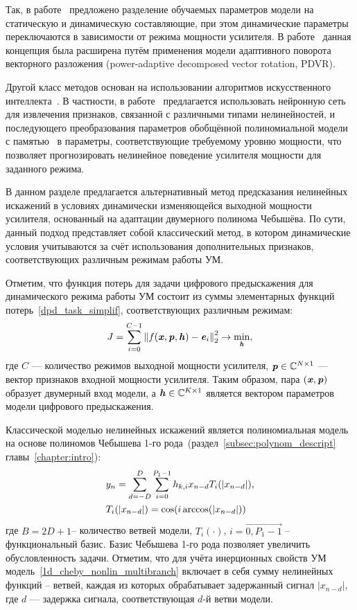 Так, в работе~\cite{GuoYan_PA_DPD_2015} предложено разделение обучаемых параметров модели на статическую и динамическую составляющие, при этом динамические параметры переключаются в зависимости от режима мощности усилителя. В работе~\cite{GuoYan_PA_DPD_Poly} данная концепция была расширена путём применения модели адаптивного поворота векторного разложения (power-adaptive decomposed vector rotation, PDVR).

Другой класс методов основан на использовании алгоритмов искусственного интеллекта~\cite{Dynamic_DPD_ANN, Dynamic_DPD_CNN}. В частности, в работе~\cite{Dynamic_DPD_ANN} предлагается использовать нейронную сеть для извлечения признаков, связанной с различными типами нелинейностей, и последующего преобразования параметров обобщённой полиномиальной модели с памятью~\cite{dpd_models} в параметры, соответствующие требуемому уровню мощности, что позволяет прогнозировать нелинейное поведение усилителя мощности для заданного режима.

В данном разделе предлагается альтернативный метод предсказания нелинейных искажений в условиях динамически изменяющейся выходной мощности усилителя, основанный на адаптации двумерного полинома Чебышёва. По сути, данный подход представляет собой классический метод, в котором динамические условия учитываются за счёт использования дополнительных признаков, соответствующих различным режимам работы УМ.

Отметим, что функция потерь для задачи цифрового предыскажения для динамического режима работы УМ состоит из суммы элементарных функций потерь~\eqref{dpd_task_simplif}, соответствующих различным режимам:
\begin{equation}
	\displaystyle J=\sum_{i=0}^{C-1}\left\lVert f(\textbf{\textit{x}}, \textbf{\textit{p}}, \textbf{\textit{h}}) - \textbf{\textit{e}}_i \right\rVert_2^2 \rightarrow \displaystyle\min_{\textbf{\textit{h}}},
	\label{dpd_task_simplif_dynamic}
\end{equation}
где $C$ — количество режимов выходной мощности усилителя, $\textbf{\textit{p}}\in\mathbb{C}^{N\times1}$ — вектор признаков входной мощности усилителя. Таким образом, пара $(\textbf{\textit{x}}, \textbf{\textit{p}})$ образует двумерный вход модели, а $\textbf{\textit{h}}\in\mathbb{C}^{K\times1}$ является вектором параметров модели цифрового предыскажения.

Классической моделью нелинейных искажений является полиномиальная модель на основе полиномов Чебышева 1-го рода~(раздел~\ref{subsec:polynom_descript} главы~\ref{chapter:intro}):
\begin{align}
	\displaystyle &y_n=\sum_{d=-D}^{D}\sum_{i=0}^{P_1-1}h_{k, i}x_{n-d}T_{i}(|x_{n-d}|), \nonumber \\
	&T_{i}(|x_{n-d}|)=\cos(i\arccos(|x_{n-d}|))
	\label{1d_cheby_nonlin_multibranch}
\end{align}
где $B=2D+1$-- количество ветвей модели, $T_{i}(\cdot)$, $i=\overrightarrow{0, P_1-1}$ -- функциональный базис. Базис Чебышева 1-го рода позволяет увеличить обусловленность задачи. Отметим, что для учёта инерционных свойств УМ модель~\eqref{1d_cheby_nonlin_multibranch} включает в себя сумму нелинейных функций -- ветвей, каждая из которых обрабатывает задержанный сигнал $|x_{n-d}|$, где $d$ — задержка сигнала, соответствующая $d$-й ветви модели. 

